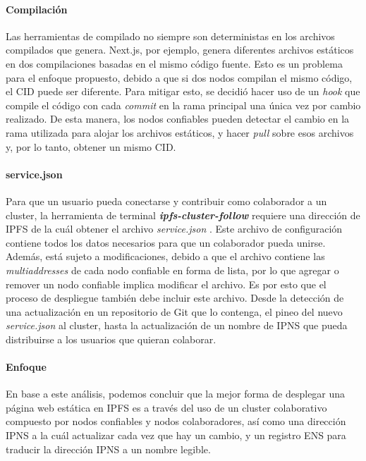 \paragraph{Compilación} Las herramientas de compilado no siempre son deterministas en los archivos compilados que genera. Next.js, por ejemplo, genera diferentes archivos estáticos en dos compilaciones basadas en el mismo código fuente. Esto es un problema para el enfoque propuesto, debido a que si dos nodos compilan el mismo código, el CID puede ser diferente. Para mitigar esto, se decidió hacer uso de un \textit{hook} que compile el código con cada \textit{commit} en la rama principal una única vez por cambio realizado. De esta manera, los nodos confiables pueden detectar el cambio en la rama utilizada para alojar los archivos estáticos, y hacer \textit{pull} sobre esos archivos y, por lo tanto, obtener un mismo CID.

\paragraph{service.json} Para que un usuario pueda conectarse y contribuir como colaborador a un cluster, la herramienta de terminal \textit{\textbf{ipfs-cluster-follow}} \cite{ipfs-cluster-follow} requiere una dirección de IPFS de la cuál obtener el archivo \textit{service.json} \cite{service-json}. Este archivo de configuración contiene todos los datos necesarios para que un colaborador pueda unirse. Además, está sujeto a modificaciones, debido a que el archivo contiene las \textit{multiaddresses} \cite{multiaddr} de cada nodo confiable en forma de lista, por lo que agregar o remover un nodo confiable implica modificar el archivo. Es por esto que el proceso de despliegue también debe incluir este archivo. Desde la detección de una actualización en un repositorio de Git que lo contenga, el pineo del nuevo \textit{service.json} al cluster, hasta la actualización de un nombre de IPNS que pueda distribuirse a los usuarios que quieran colaborar.

\paragraph{Enfoque}

En base a este análisis, podemos concluir que la mejor forma de desplegar una página web estática en IPFS es a través del uso de un cluster colaborativo compuesto por nodos confiables y nodos colaboradores, así como una dirección IPNS a la cuál actualizar cada vez que hay un cambio, y un registro ENS para traducir la dirección IPNS a un nombre legible.

